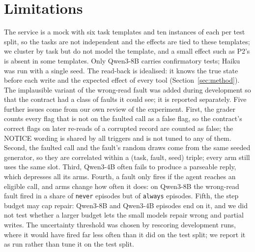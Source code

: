 \section{Limitations}\label{sec:limitations}
The service is a mock with six task templates and ten instances of each per test split, so the tasks are
not independent and the effects are tied to these templates; we cluster by task but do not model the
template, and a small effect such as P2's is absent in some templates. Only
Qwen3-8B carries confirmatory tests; Haiku was run with a single seed. The read-back is idealised: it
knows the true state before each write and the expected effect of every tool (Section~\ref{sec:method}).
The implausible variant of the wrong-read fault was added during development so that the contract had a
class of faults it could see; it is reported separately. Five further issues come from our own review of
the experiment. First, the grader counts every flag that is not on the faulted call as a false flag,
so the contract's correct flags on later re-reads of a corrupted record are counted as false; the
NOTICE wording is shared by all triggers and is not tuned to any of them. Second, the faulted call and
the fault's random draws come from the same seeded generator, so they are correlated within a (task,
fault, seed) triple; every arm still uses the same slot. Third, Qwen3-4B often fails to produce a
parseable reply, which depresses all its arms. Fourth, a fault only fires if the agent reaches an
eligible call, and arms change how often it does: on Qwen3-8B the wrong-read fault fired in a share
\RExpQwenEightAppliedNeverRead{} of \texttt{never} episodes but \RExpQwenEightAppliedAlwaysRead{} of
\texttt{always} episodes. Fifth, the step budget may cap repair: \RExpQwenEightStatusBudgetExhausted{}
Qwen3-8B and \RExpQwenFourStatusBudgetExhausted{} Qwen3-4B episodes end on it, and we did not test
whether a larger budget lets the small models repair wrong and partial writes. The uncertainty
threshold was chosen by rescoring development runs, where it would have fired far less often than it
did on the test split; we report it as run rather than tune it on the test split.

